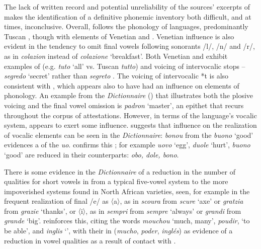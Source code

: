 \documentclass[output=paper]{langsci/langscibook}
\begin{document}
	The  lack of written record and potential unreliability of the sources’ excerpts of  makes the identification of a definitive phonemic inventory both difficult, and at times, inconclusive. Overall,  follows the phonology of  languages, predominantly Tuscan , though with elements of Venetian and . Venetian influence is also evident in the  tendency to omit final vowels following sonorants /l/, /n/ and /r/, as in \textit{colazion} instead of \textit{colazione} ‘breakfast’. Both Venetian and  exhibit examples of  (e.g. \textit{tuto} `all' vs. Tuscan \textit{tutto}) and voicing of intervocalic stops – \textit{segredo} `secret' rather than \textit{segreto} \citep{Ursini2011}. The voicing of intervocalic *t is also consistent with , which appears also to have had an influence on elements of  phonology. An example from the \textit{Dictionnaire} (\citeyear[63]{Anonymous1830}) that illustrates both the plosive voicing and the final vowel omission is \textit{padron} ‘master’, an epithet that recurs throughout the corpus of attestations. However, in terms of the language’s vocalic system,  appears to exert some influence. \citet{Cifoletti2004} suggests that  influence on the realization of vocalic elements can be seen in the \textit{Dictionnaire}: \textit{bonou} from the  \textit{buono} ‘good’ evidences a  of the  \textit{uo}. \citet[444]{Bergareche1993} confirms this ; for example  \textit{uovo} ‘egg’, \textit{duole} ‘hurt’, \textit{buono} ‘good’ are reduced in their  counterparts: \textit{obo, dole, bono}. 
	
	There is some evidence in the \textit{Dictionnaire} of a reduction in the number of qualities for short vowels in  from a typical five-vowel  system to the more impoverished systems found in North African  varieties, seen, for example in the frequent realization of final /e/ as 〈a〉, as in \textit{scoura} from \textit{scure} ‘axe’ or \textit{gratzia} from \textit{grazie} ‘thanks’, or 〈i〉, as in \textit{sempri} from \textit{sempre} ‘always’ or \textit{grandi} from \textit{grande} ‘big’. \citet[444]{Bergareche1993} reinforces this, citing the  words \textit{mouchou} ‘much, many’, \textit{poudir}, ‘to be able’, and \textit{inglis} ‘’, with their  in  (\textit{mucho}, \textit{poder}, \textit{inglés}) as evidence of a reduction in vowel qualities as a result of contact with . 
	
\end{document}
